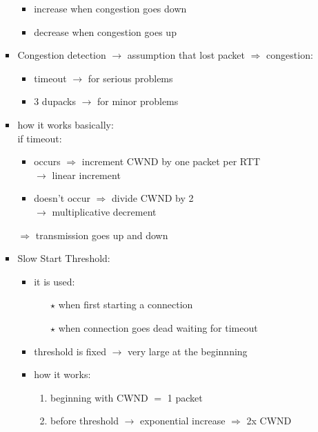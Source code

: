 \begin{itemize}
\begin{itemize}
\begin{itemize}
            \begin{itemize}
                \item increase when congestion goes down
                \item decrease when congestion goes up
            \end{itemize}
            \item Congestion detection $\rightarrow$ assumption that lost packet $\Rightarrow$ congestion:
            \begin{itemize}
                \item timeout $\rightarrow$ for serious problems
                \item 3 dupacks $\rightarrow$ for minor problems
            \end{itemize}
            \item how it works basically:\\[0.2cm]
            if timeout:
            \begin{itemize}
                \item occurs $\Rightarrow$ increment CWND by one packet per RTT\\
                $\rightarrow$ linear increment
                \item doesn't occur $\Rightarrow$ divide CWND by 2\\
                $\rightarrow$ multiplicative decrement
            \end{itemize}
            $\Rightarrow$ transmission goes up and down
            \item Slow Start Threshold:
            \begin{itemize}
                \item it is used:
                \begin{enumerate}
                    \item[$\star$] when first starting a connection
                    \item[$\star$] when connection goes dead waiting for timeout
                \end{enumerate}
                \item threshold is fixed $\rightarrow$ very large at the beginnning
                \item how it works:
                \begin{enumerate}
                    \item beginning with CWND $=$ 1 packet
                    \item before threshold $\rightarrow$ exponential increase $\Rightarrow$ 2x CWND

\end{enumerate}
\end{itemize}
\end{itemize}
\end{itemize}
\end{itemize}
